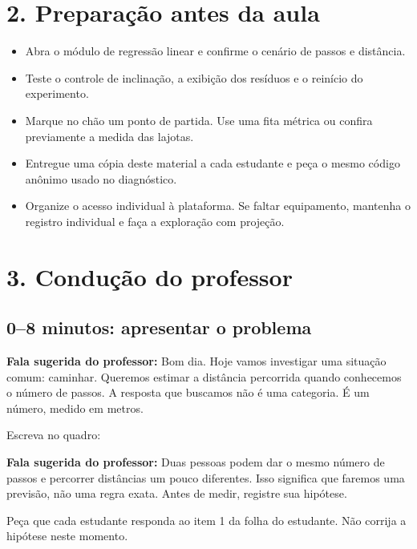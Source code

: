 \documentclass[12pt,a4paper]{article}
\newcommand{\fala}[1]{%
  \noindent\colorbox{cinza}{\parbox{0.96\linewidth}{\textbf{Fala sugerida do professor:} #1}}%
}
\begin{document}
\section*{2. Preparação antes da aula}

\begin{itemize}
  \item Abra o módulo de regressão linear e confirme o cenário de passos e distância.
  \item Teste o controle de inclinação, a exibição dos resíduos e o reinício do experimento.
  \item Marque no chão um ponto de partida. Use uma fita métrica ou confira previamente a medida das lajotas.
  \item Entregue uma cópia deste material a cada estudante e peça o mesmo código anônimo usado no diagnóstico.
  \item Organize o acesso individual à plataforma. Se faltar equipamento, mantenha o registro individual e faça a exploração com projeção.
\end{itemize}

\newpage

\section*{3. Condução do professor}

\subsection*{0--8 minutos: apresentar o problema}

\fala{Bom dia. Hoje vamos investigar uma situação comum: caminhar. Queremos estimar a distância percorrida quando conhecemos o número de passos. A resposta que buscamos não é uma categoria. É um número, medido em metros.}

Escreva no quadro:

\begin{center}
\end{center}

\fala{Duas pessoas podem dar o mesmo número de passos e percorrer distâncias um pouco diferentes. Isso significa que faremos uma previsão, não uma regra exata. Antes de medir, registre sua hipótese.}

Peça que cada estudante responda ao item 1 da folha do estudante. Não corrija a hipótese neste momento.
\end{document}
